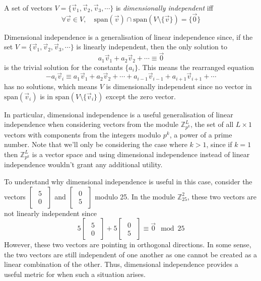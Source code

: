 \documentclass[a4paper, reqno, 12pt]{amsart}
\newcommand\vecspan[1]{\text{span}(#1)}
\begin{document}
	A set of vectors $V = \{\vec{v}_{1}, \vec{v}_{2}, \vec{v}_{3}, \cdots \}$ is \emph{dimensionally independent} iff
	\[
		\forall \vec{v} \in V, \quad \vecspan{\vec{v}} \cap \vecspan{V\setminus\{\vec{v}\}} = \{\vec{0}\}
	\]
	
	Dimensional independence is a generalisation of linear independence since, if the set $V = \{\vec{v}_{1}, \vec{v}_{2}, \vec{v}_{3}, \cdots \}$ is
	linearly independent, then the only solution to
	\[
		a_{1}\vec{v}_{1} + a_{2}\vec{v}_{2} + \cdots \equiv \vec{0}
	\]
	is the trivial solution for the constants $\{a_i\}$. This means the rearranged equation
	\[
		-a_{i}\vec{v}_{i} \equiv a_1\vec{v}_1 + a_2\vec{v}_2 + \cdots + a_{i-1}\vec{v}_{i-1} + a_{i+1}\vec{v}_{i+1} + \cdots
	\]
	has no solutions, which means $V$ is dimensionally independent since no vector in $\vecspan{\vec{v}_i}$ is in $\vecspan{V \setminus \{\vec{v}_i\}}$ except
	the zero vector.
	
	In particular, dimensional independence is a useful generalisation of linear independence when considering vectors from the module $\mathds{Z}_{p^k}^{L}$, the set
	of all $L \times 1$ vectors with components from the integers modulo $p^k$, a power of a prime number. Note that we'll only be considering the case where $k > 1$, 
	since if $k = 1$ then $\mathds{Z}_{p^k}^{L}$ is a vector space and using dimensional independence instead of linear independence wouldn't
	grant any additional utility. 
	
	To understand why dimensional independence is useful in this case, consider the vectors $
	\begin{bmatrix}
		\begin{smallmatrix}
			5 \\
			0
		\end{smallmatrix}
	\end{bmatrix}
	$ and $
	\begin{bmatrix}
		\begin{smallmatrix}
			0 \\
			5
		\end{smallmatrix}
	\end{bmatrix}
	$ modulo 25. In the module $\mathds{Z}_{25}^{2}$, these two vectors are not linearly independent since
	\[
		5
		\begin{bmatrix}
			\begin{smallmatrix}
				5 \\
				0
			\end{smallmatrix}
		\end{bmatrix}
		+
		5
		\begin{bmatrix}
			\begin{smallmatrix}
				0 \\
				5
			\end{smallmatrix}
		\end{bmatrix}
		\equiv \vec{0} \mod{25}
	\]
	However, these two vectors are pointing in orthogonal directions. In some sense, the two vectors are still independent of one another as one cannot be created as 
	a linear combination of the other. Thus, dimensional independence provides a useful metric for when such a situation arises.
	
\end{document}

